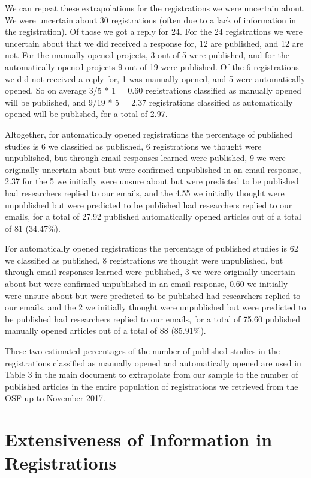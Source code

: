 \documentclass[
  ,jou, a4paper,floatsintext]{apa6}
\begin{document}
We can repeat these extrapolations for the registrations we were uncertain about. We were uncertain about 30 registrations (often due to a lack of information in the registration). Of those we got a reply for 24. For the 24 registrations we were uncertain about that we did received a response for, 12 are published, and 12 are not. For the manually opened projects, 3 out of 5 were published, and for the automatically opened projects 9 out of 19 were published. Of the 6 registrations we did not received a reply for, 1 was manually opened, and 5 were automatically opened. So on average 3/5 * 1 = 0.60 registrations classified as manually opened will be published, and 9/19 * 5 = 2.37 registrations classified as automatically opened will be published, for a total of 2.97.

Altogether, for automatically opened registrations the percentage of published studies is 6 we classified as published, 6 registrations we thought were unpublished, but through email responses learned were published, 9 we were originally uncertain about but were confirmed unpublished in an email response, 2.37 for the 5 we initially were unsure about but were predicted to be published had researchers replied to our emails, and the 4.55 we initially thought were unpublished but were predicted to be published had researchers replied to our emails, for a total of 27.92 published automatically opened articles out of a total of 81 (34.47\%).

For automatically opened registrations the percentage of published studies is 62 we classified as published, 8 registrations we thought were unpublished, but through email responses learned were published, 3 we were originally uncertain about but were confirmed unpublished in an email response, 0.60 we initially were unsure about but were predicted to be published had researchers replied to our emails, and the 2 we initially thought were unpublished but were predicted to be published had researchers replied to our emails, for a total of 75.60 published manually opened articles out of a total of 88 (85.91\%).

These two estimated percentages of the number of published studies in the registrations classified as manually opened and automatically opened are used in Table 3 in the main document to extrapolate from our sample to the number of published articles in the entire population of registrations we retrieved from the OSF up to November 2017.

\hypertarget{extensiveness-of-information-in-registrations}{%
\section{Extensiveness of Information in Registrations}\label{extensiveness-of-information-in-registrations}}
\end{document}
